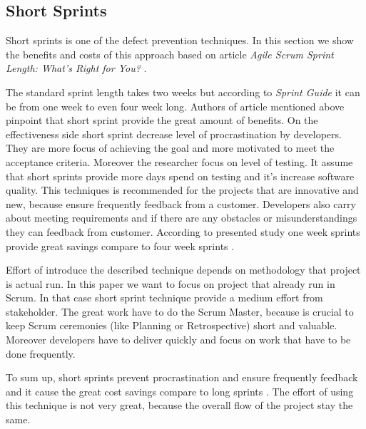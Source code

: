 \subsection*{Short Sprints}

Short sprints is one of the defect prevention techniques. In this section we show the benefits and costs of this approach based on article \textit{Agile Scrum Sprint Length:
What’s Right for You? } \cite{agilesprints}.

The standard sprint length takes two weeks but according to \textit{Sprint Guide} it can be from one week to even four week long. Authors of article mentioned above pinpoint that short sprint provide the great amount of benefits. On the effectiveness side short sprint decrease level of procrastination by developers. They are more focus of achieving the goal and more motivated to meet the acceptance criteria. Moreover the researcher focus on level of testing. It assume that short sprints provide more days spend on testing and it's increase software quality. This techniques is recommended for the projects that are innovative and new, because ensure frequently feedback from a customer. Developers also carry about meeting requirements and if there are any obstacles or misunderstandings they can feedback from customer. According to presented study one week sprints provide great savings compare to four week sprints \cite{agilesprints}.

Effort of introduce the described technique depends on methodology that project is actual run.  In this paper we want to focus on project that already run in Scrum. In that case short sprint technique provide a medium effort from stakeholder. The great work have to do the Scrum Master, because is crucial to keep Scrum ceremonies (like Planning or Retrospective) short and valuable. Moreover developers have to deliver quickly and focus on work that have to be done frequently. 

To sum up, short sprints prevent procrastination and ensure frequently feedback and it cause the great cost savings compare to long sprints \cite{agilesprints}. The effort of using this technique is not very great, because the overall flow of the project stay the same.